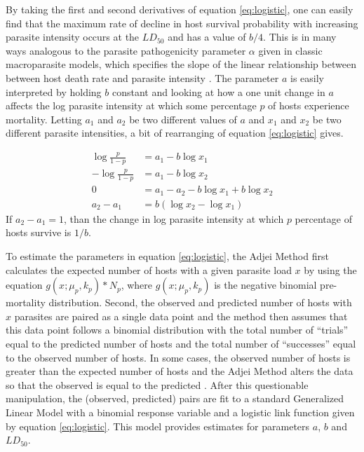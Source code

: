 \documentclass[12pt, a4paper]{article}
\begin{document}
By taking the first and second derivatives of equation \ref{eq:logistic}, one can easily find that the maximum rate of decline in host survival probability with increasing parasite intensity occurs at the $LD_{50}$ and has a value of $b / 4$.  This is in many ways analogous to the parasite pathogenicity parameter $\alpha$ given in classic macroparasite models, which specifies the slope of the linear relationship between between host death rate and parasite intensity \citep{AndersonandMay1978, Isham1995}.  The parameter $a$ is easily interpreted by holding $b$ constant and looking at how a one unit change in $a$ affects the log parasite intensity at which some percentage $p$ of hosts experience mortality.  Letting $a_1$ and $a_2$ be two different values of $a$ and $x_1$ and $x_2$ be two different parasite intensities, a bit of rearranging of equation \ref{eq:logistic} gives.

\begin{align*}
    \log{\frac{p}{1 - p}} &= a_1 - b \log{x_1}\\
    - \log{\frac{p}{1 - p}} &= a_1 - b \log{x_2}\\
    0 &= a_1 - a_2 - b\log{x_1} + b\log{x_2}\\
    a_2 - a_1 &= b(\log{x_2} - \log{x_1})
\end{align*}
If $a_2 - a_1 = 1$, than the change in log parasite intensity at which $p$ percentage of hosts survive is $1 / b$.

To estimate the parameters in equation \ref{eq:logistic}, the Adjei Method first
calculates the expected number of hosts with a given parasite load $x$ by using
the equation $g(x ; \mu_p, k_p) * N_p$, where $g(x ; \mu_p, k_p)$ is the negative binomial pre-mortality distribution.  Second, the observed and predicted number of hosts
with $x$ parasites are paired as a single data point and the method then assumes that
this data point follows a binomial distribution with the total number of
``trials'' equal to the predicted number of hosts and the total number of
``successes'' equal to the observed number of hosts. In some cases, the
observed number of hosts is greater than the expected number of hosts and the
Adjei Method alters the data so that the observed is equal to the predicted
\citep{Adjei1986}.  After this questionable manipulation, the (observed, predicted) pairs are fit to a standard Generalized Linear Model \citep{McCullagh1989} with a binomial response variable and a logistic link function given by equation \ref{eq:logistic}.  This model provides estimates for parameters $a$, $b$ and $LD_{50}$.
\end{document}
